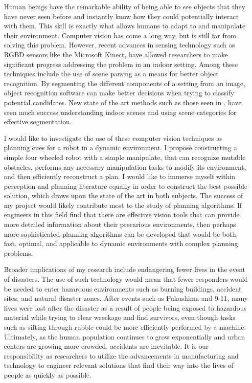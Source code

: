 \documentclass[10pt]{article}
\begin{document}
Human beings have the remarkable ability of being able to see objects that they
have never seen before and instantly know how they could potentially interact
with them. This skill is exactly what allows humans to adapt to and manipulate
their environment. Computer vision has come a long way, but is still far from
solving this problem. However, recent advances in sensing technology such as
RGBD sensors like the Microsoft Kinect, have allowed researchers to make
significant progress addressing the problem in an indoor setting. Among these
techniques include the use of scene parsing as a means for better object
recognition. By segmenting the different components of a setting from an image,
object recognition software can make better decisions when trying to classify
potential candidates. New state of the art methods such as those seen in
\cite{gupta}, have seen much success understanding indoor scenes and using
scene categories for effective segmentation.

I would like to investigate the use of these computer vision techniques as
planning cues for a robot in a dynamic environment. I propose constructing a
simple four wheeled robot with a simple manipulate, that can recognize mutable
obstacles, performs any necessary manipulation tasks to modify its environment,
and then efficiently reconstruct a plan. I would like to immerse myself within
perception and planning literature equally in order to construct the best
possible solution, which draws upon the state of the art in both subjects. The
success of my project would likely contribute most to the study of planning
algorithms. If engineers in this field find that there are effective vision
tools that can provide more detailed information about their precarious
environments, then perhaps more sophisticated planning algorithms can be
developed that would be both fast, optimal, and applicable to dynamic
environments with complex planning problems.

Broader implications of my research include endangering fewer lives in the
event of disasters. The use of such technology would mean that fewer responders
would be needed to enter hazardous environments such as burning buildings,
accident sites, and natural disaster zones. After events such as Fukushima and
9-11, many lives were lost after the disaster as a result of people being
exposed to hazardous material while trying to clear wreckage and find
survivors, even though tasks such as sifting through rubble could be more
efficiently performed by a machine. Ultimately, as the human population
continues to grow exponentially and urban centers are growing more crowded,
accidents are inevitable.  It is our responsibility as researchers to utilize
the advancements in manufacturing and technology to engineer relevant solutions
that find their way into the lives of people as quickly as possible.
\end{document}
